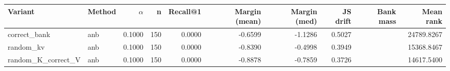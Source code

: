 \begin{tabular}{l l r r r r r r r r}
\toprule
Variant & Method & $\alpha$ & n & Recall@1 & Margin (mean) & Margin (med) & JS drift & Bank mass & Mean rank \\
\midrule
correct\_bank & anb & 0.1000 & 150 & 0.0000 & -0.6599 & -1.1286 & 0.5027 &  & 24789.8267 \\
random\_kv & anb & 0.1000 & 150 & 0.0000 & -0.8390 & -0.4998 & 0.3949 &  & 15368.8467 \\
random\_K\_correct\_V & anb & 0.1000 & 150 & 0.0000 & -0.8878 & -0.7859 & 0.3726 &  & 14617.5400 \\
\bottomrule
\end{tabular}
